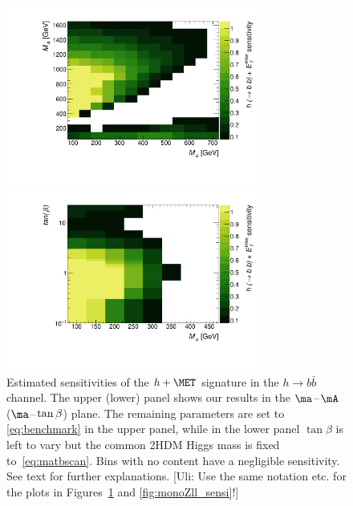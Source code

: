\begin{figure}[t!]
\centering
\includegraphics[width=0.75\textwidth]{texinputs/04_grid/figures/monoHbb_sensi_sum_bins_1_2_3_4_ma_vs_mA_lin.pdf}

\vspace{2mm}

\includegraphics[width=0.75\textwidth]{texinputs/04_grid/figures/monoHbb_sensi_sum_bins_1_2_3_4_ma_vs_tanb_lin.pdf}
\vspace{2mm}
\caption{Estimated sensitivities of the $h+\MET$ signature in the $h \to b \bar b$ channel. The upper (lower) panel shows our results in the $\ma\hspace{0.25mm}$--$\hspace{0.25mm}\mA$ ($\ma\hspace{0.25mm}$--$\hspace{0.25mm}\tan \beta$) plane. {\color{red} The remaining parameters are set to \eqref{eq:benchmark} in the upper panel, while in the lower panel $\tan \beta$ is left to vary but the common 2HDM Higgs mass is fixed to~\eqref{eq:matbscan}.} Bins with no content have a negligible sensitivity. See text for further explanations. {\color{red} [Uli: Use the same notation etc. for the plots in Figures~\ref{fig:monoHbb_sensi} and \ref{fig:monoZll_sensi}!]}}
\label{fig:monoHbb_sensi}
\end{figure}

